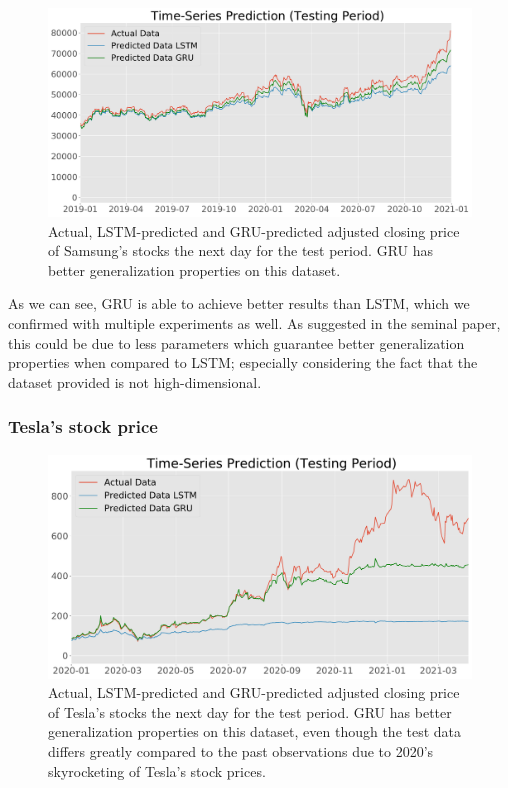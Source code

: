 \documentclass[12pt]{article}
\begin{document}
\begin{figure}
    \centering
    \includegraphics[width=\linewidth]{images/prediction_base_test_lstm_gru.pdf}
    \caption{Actual, LSTM-predicted and GRU-predicted adjusted closing price of Samsung's stocks the next day for the test period. GRU has better generalization properties on this dataset.}
    \label{fig:lstm_vs_gru_all}
\end{figure}

As we can see, GRU is able to achieve better results than LSTM, which we confirmed with multiple experiments as well. As suggested in the seminal paper, this could be due to less parameters which guarantee better generalization properties when compared to LSTM; especially considering the fact that the dataset provided is not high-dimensional.

\subsubsection{Tesla's stock price}

\begin{figure}
    \centering
    \includegraphics[width=\linewidth]{images/prediction_test_lstm_gru_tesla.pdf}
    \caption{Actual, LSTM-predicted and GRU-predicted adjusted closing price of Tesla's stocks the next day for the test period. GRU has better generalization properties on this dataset, even though the test data differs greatly compared to the past observations due to 2020's skyrocketing of Tesla's stock prices.}
    \label{fig:lstm_vs_gru_test_tesla}
\end{figure}
\end{document}
